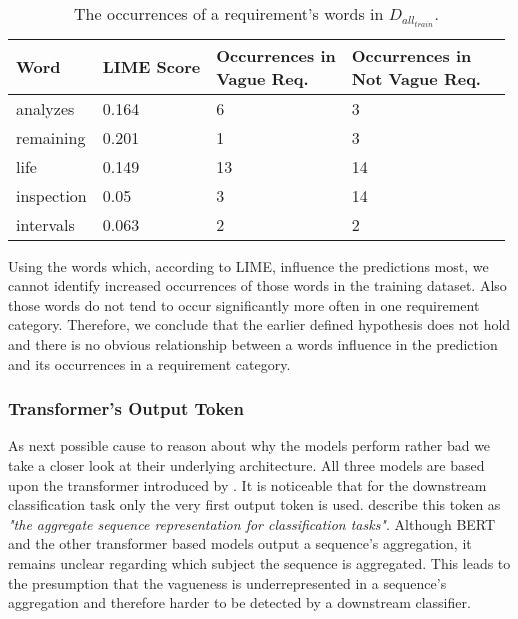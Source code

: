 \begin{table}[htpb]
    \centering
    \begin{tabular}{l | l l l l }
        \toprule
         Word & \ac{LIME} Score & \makecell{Occurrences in\\Vague Req.} & \makecell{Occurrences in\\Not Vague Req.} \\
        \hline
        analyzes & 0.164 & 6 & 3 \\
        remaining & 0.201 & 1 & 3  \\
        life & 0.149 & 13 & 14\\
        inspection & 0.05 & 3 & 14 \\
        intervals & 0.063 & 2 & 2 \\
        \bottomrule
    \end{tabular}
    \caption[Study Interpretation: Word Occurrences]{The occurrences of a requirement's words in $D_{all_{train}}$.}\label{tab:study:interpretation:LIME}
\end{table}

Using the words which, according to \ac{LIME}, influence the predictions most, we cannot identify increased occurrences of those words in the training dataset.
Also those words do not tend to occur significantly more often in one requirement category.
Therefore, we conclude that the earlier defined hypothesis does not hold and there is no obvious relationship between a words influence in the prediction and its occurrences in a requirement category.

\subsubsection{Transformer's Output Token}
\label{chp:study:sec:interpretation:subsec:causes:transformer_ouput_token}
As next possible cause to reason about why the models perform rather bad we take a closer look at their underlying architecture.
All three models are based upon the transformer introduced by \textcite{Vaswani:2017}.
It is noticeable that for the downstream classification task only the very first output token is used.
\Textcite{Devlin:2018} describe this token as \textit{"the aggregate sequence representation for classification tasks"}.
Although \ac{BERT} and the other transformer based models output a sequence's aggregation, it remains unclear regarding which subject the sequence is aggregated.
This leads to the presumption that the vagueness is underrepresented in a sequence's aggregation and therefore harder to be detected by a downstream classifier.

